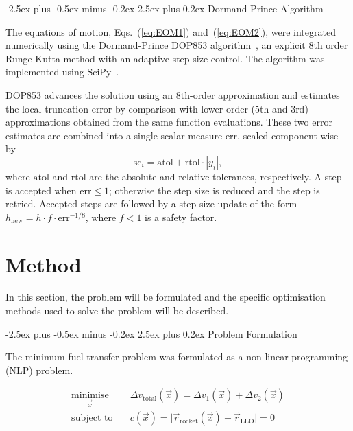 \documentclass[10pt,twocolumn]{revtex4-2}    %
\makeatletter
\renewcommand{\subsection}{\@startsection{subsection}{2}{\z@}%
  {-2.5ex plus -0.5ex minus -0.2ex}%
  {2.5ex plus 0.2ex}%
  {\normalfont\normalsize\bfseries}}
\makeatother
\begin{document}
\subsection{Dormand-Prince Algorithm}
\label{sec:Dormand-Prince Algorithm}

The equations of motion, Eqs.~(\ref{eq:EOM1}) and~(\ref{eq:EOM2}), were 
integrated numerically using the Dormand-Prince DOP853 
algorithm~\cite{hairer1993}, an explicit 8th order Runge Kutta method 
with an adaptive step size control. The algorithm was implemented using SciPy~\cite{virtanen2020}.

DOP853 advances the solution using an 8th-order approximation and 
estimates the local truncation error by comparison with lower order 
(5th and 3rd) approximations obtained from the same function evaluations. 
These two error estimates are combined into a single scalar measure 
$\mathrm{err}$, scaled component wise by
%
\begin{equation}
    \mathrm{sc}_i = \mathrm{atol} + \mathrm{rtol} \cdot |y_i|,
    \label{eq:sc}
\end{equation}
%
where $\mathrm{atol}$ and $\mathrm{rtol}$ are the absolute and relative 
tolerances, respectively. A step is accepted when $\mathrm{err} \leq 1$; 
otherwise the step size is reduced and the step is retried. Accepted steps 
are followed by a step size update of the form $h_{\mathrm{new}} = h 
\cdot f \cdot \mathrm{err}^{-1/8}$, where $f < 1$ is a safety factor. 

\section{Method}
\label{sec:Method}

In this section, the problem will be formulated and the specific optimisation methods used to solve the problem will be described.

\subsection{Problem Formulation}

The minimum fuel transfer problem was formulated as a non-linear programming (NLP) problem. 

\begin{subequations}\label{eq:opt}
\begin{align}
  \underset{\vec{x}}{\text{minimise}} \quad & \Delta v_{\text{total}}(\vec{x}) = \Delta v_{1}(\vec{x}) + \Delta v_{2}(\vec{x}) \label{eq:opt_obj} \\
  \text{subject to} \quad & c(\vec{x}) = \lvert \vec{r}_{\text{rocket}}(\vec{x}) - \vec{r}_{\text{LLO}} \rvert = 0 \label{eq:opt_con}
\end{align}
\end{subequations}
\end{document}
